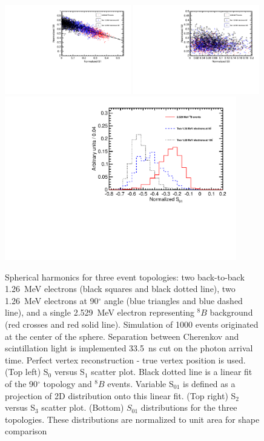 \documentclass[12pt,twoside,letterpaper]{article}
\newcommand{\B}{^{8}B}
\begin{document}
\begin{figure}[htb]
\centering
\includegraphics[angle=0,width=0.49\textwidth]{plots/hS0vsS1_topologies_allLight_VtxSmear0cm_VtxShiftX0cm_33p5ns_center.pdf}
\includegraphics[angle=0,width=0.49\textwidth]{plots/hS2vsS3_topologies_allLight_VtxSmear0cm_VtxShiftX0cm_33p5ns_center.pdf}
\includegraphics[angle=0,width=0.9\textwidth]{plots/hS01_topologies_allLight_VtxSmear0cm_VtxShiftX0cm_33p5ns_center.pdf}
\caption{Spherical harmonics for three event topologies: two back-to-back 1.26~MeV electrons (black squares and black dotted line), two 1.26~MeV electrons at 90$^{\circ}$ angle (blue triangles and blue dashed line), and a single 2.529~MeV electron representing $\B$ background (red crosses and red solid line). Simulation of 1000 events originated at the center of the sphere. Separation between Cherenkov and scintillation light is implemented 33.5~ns cut on the photon arrival time. Perfect vertex reconstruction - true vertex position is used. (Top left) S$_0$ versus S$_1$ scatter plot. Black dotted line is a linear fit of the 90$^{\circ}$ topology and $\B$ events. Variable S$_{01}$ is defined as a projection of 2D distribution onto this linear fit. (Top right) S$_2$ versus S$_3$ scatter plot. (Bottom) $S_{01}$ distributions for the three topologies. These distributions are normalized to unit area for shape comparison}
\label{fig:SL_topologies_all}
\end{figure}
\end{document}
